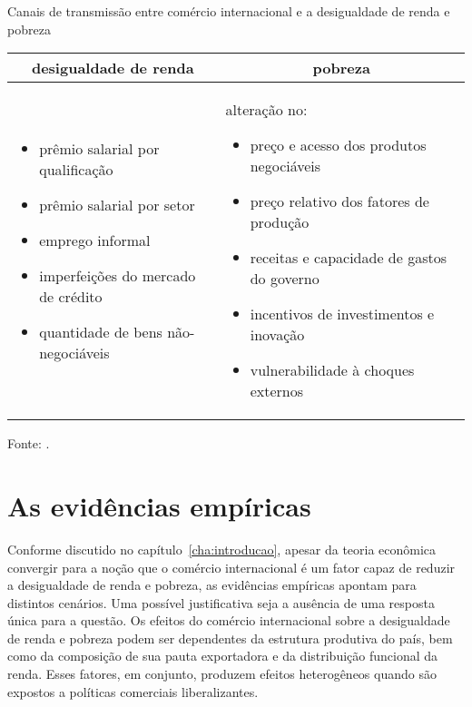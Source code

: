 \begin{quadro}[h]
	\begin{threeparttable}
		\centering
		\caption{Canais de transmissão entre comércio internacional e a desigualdade de renda e pobreza}
		\footnotesize
		\label{quad:canais_de_transmissao}
		\begin{tabular}{|| m{7.5cm} | m{7.5cm} ||}
			\hline \hline
			\multicolumn{1}{||c|}{\textbf{desigualdade de renda}} & \multicolumn{1}{c||}{\textbf{pobreza}} \\ \hline
			\begin{itemize}
				\item prêmio salarial por qualificação
				\item prêmio salarial por setor
				\item emprego informal
				\item imperfeições do mercado de crédito
				\item quantidade de bens não-negociáveis
			\end{itemize} &
			\vspace{0.2cm}
			alteração no:
			\begin{itemize}
			\item preço e acesso dos produtos negociáveis
			\item preço relativo dos fatores de produção
			\item receitas e capacidade de gastos do governo
			\item incentivos de investimentos e inovação
			\item vulnerabilidade à choques externos
			\end{itemize} \\ \hline \hline
		\end{tabular}
		\begin{tablenotes}
			\scriptsize
			\item Fonte: \textcite{bannisterthugge01, xu03, goldbergpavcnik04, banerjee04}.
		\end{tablenotes}
	\end{threeparttable}
\end{quadro}



\section{As evidências empíricas} \label{sec:evidencias_empiricas}

Conforme discutido no capítulo~\ref{cha:introducao}, apesar da teoria econômica convergir para a noção que o comércio internacional é um fator capaz de reduzir a desigualdade de renda e pobreza, as evidências empíricas apontam para distintos cenários. Uma possível justificativa seja a ausência de uma resposta única para a questão. Os efeitos do comércio internacional sobre a desigualdade de renda e pobreza podem ser dependentes da estrutura produtiva do país, bem como da composição de sua pauta exportadora e da distribuição funcional da renda. Esses fatores, em conjunto, produzem efeitos heterogêneos quando são expostos a políticas comerciais liberalizantes.

